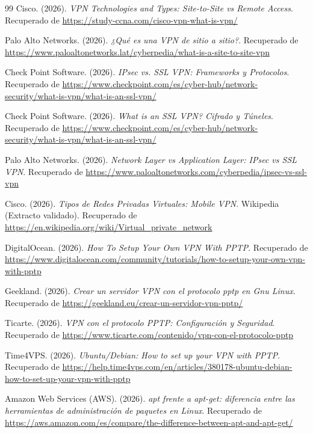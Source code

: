 \documentclass[a4paper,12pt]{article}
\begin{document}
\begin{thebibliography}{99}
    Cisco. (2026). \textit{VPN Technologies and Types: Site-to-Site vs Remote Access}. Recuperado de \url{https://study-ccna.com/cisco-vpn-what-is-vpn/}

    Palo Alto Networks. (2026). \textit{¿Qué es una VPN de sitio a sitio?}. Recuperado de \url{https://www.paloaltonetworks.lat/cyberpedia/what-is-a-site-to-site-vpn}

    Check Point Software. (2026). \textit{IPsec vs. SSL VPN: Frameworks y Protocolos}. Recuperado de \url{https://www.checkpoint.com/es/cyber-hub/network-security/what-is-vpn/what-is-an-ssl-vpn/}

    Check Point Software. (2026). \textit{What is an SSL VPN? Cifrado y Túneles}. Recuperado de \url{https://www.checkpoint.com/es/cyber-hub/network-security/what-is-vpn/what-is-an-ssl-vpn/}

    Palo Alto Networks. (2026). \textit{Network Layer vs Application Layer: IPsec vs SSL VPN}. Recuperado de \url{https://www.paloaltonetworks.com/cyberpedia/ipsec-vs-ssl-vpn}

    Cisco. (2026). \textit{Tipos de Redes Privadas Virtuales: Mobile VPN}. Wikipedia (Extracto validado). Recuperado de \url{https://en.wikipedia.org/wiki/Virtual_private_network}

    DigitalOcean. (2026). \textit{How To Setup Your Own VPN With PPTP}. Recuperado de \url{https://www.digitalocean.com/community/tutorials/how-to-setup-your-own-vpn-with-pptp}

    Geekland. (2026). \textit{Crear un servidor VPN con el protocolo pptp en Gnu Linux}. Recuperado de \url{https://geekland.eu/crear-un-servidor-vpn-pptp/}

    Ticarte. (2026). \textit{VPN con el protocolo PPTP: Configuración y Seguridad}. Recuperado de \url{https://www.ticarte.com/contenido/vpn-con-el-protocolo-pptp}

    Time4VPS. (2026). \textit{Ubuntu/Debian: How to set up your VPN with PPTP}. Recuperado de \url{https://help.time4vps.com/en/articles/380178-ubuntu-debian-how-to-set-up-your-vpn-with-pptp}

    Amazon Web Services (AWS). (2026). \textit{apt frente a apt-get: diferencia entre las herramientas de administración de paquetes en Linux}. Recuperado de \url{https://aws.amazon.com/es/compare/the-difference-between-apt-and-apt-get/}


\end{thebibliography}
\end{document}
